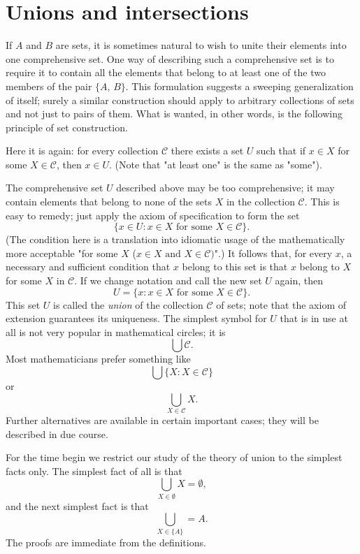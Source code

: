 \section{Unions and intersections}

If $A$ and $B$ are sets, it is sometimes natural to wish to unite their elements into one comprehensive set. One way of describing such a comprehensive set is to require it to contain all the elements that belong to at least one of the two members of the pair $\{A, \, B\}$. This formulation suggests a sweeping generalization of itself; surely a similar construction should apply to arbitrary collections of sets and not just to pairs of them. What is wanted, in other words, is the following principle of set construction.


Here it is again: for every collection $\mathcal{C}$ there exists a set $U$ such that if $x \in X$ for some $X \in \mathcal{C}$, then $x \in U$. (Note that "at least one" is the same as "some").

The comprehensive set $U$ described above may be too comprehensive; it may contain elements that belong to none of the sets $X$ in the collection $\mathcal{C}$. This is easy to remedy; just apply the axiom of specification to form the set
\[
	\{ x \in U : x \in X \text{ for some } X \in \mathcal{C}\}.
\]
(The condition here is a translation into idiomatic usage of the mathematically more acceptable "for some $X$ ($x \in X \text{ and } X \in \mathcal{C})$".) It follows that, for every $x$, a necessary and sufficient condition that $x$ belong to this set is that $x$ belong to $X$ for some $X$ in $\mathcal{C}$. If we change notation and call the new set $U$ again, then
\[
	U = \{x : x \in X \text{ for some } X \in \mathcal{C}\}.
\]
This set $U$ is called the \textit{union} of the collection $\mathcal{C}$ of sets; note that the axiom of extension guarantees its uniqueness. The simplest symbol for $U$ that is in use at all is not very popular in mathematical circles; it is
\[
	\bigcup \mathcal{C}.
\]
Most mathematicians prefer something like
\[
	\bigcup \{ X : X \in \mathcal{C}\}
\]
or
\[
	\bigcup_{X \in \mathcal{C}} X.
\]
Further alternatives are available in certain important cases; they will be described in due course.

For the time begin we restrict our study of the theory of union to the simplest facts only. The simplest fact of all is that
\[
	\bigcup_{X \in \emptyset} X = \emptyset,
\]
and the next simplest fact is that
\[
	\bigcup_{X \in \{A\}} = A.
\]
The proofs are immediate from the definitions.

